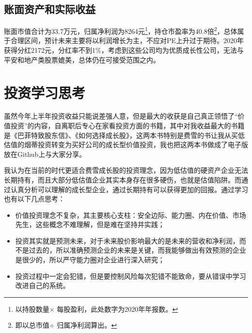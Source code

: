 \documentclass[UTF8,a4paper,12pt,lang=cn,fontset = windows]{elegantpaper} %
\begin{document}
\subsection{账面资产和实际收益}

账面市值合计为33.7万元，归属净利润为8264元\footnote{以持股数量$\times$ 每股盈利，此处数字为2020年年报数。}，持仓市盈率为40.8倍\footnote{即以总市值$\div$ 归属净利润算出。}，总体属于合理区间，预计未来主要将以利润增长为主，不应对PE上升过于期待。2020年获得分红2172元，分红率不到1\%，考虑到这些公司均为优质成长性公司，无法与平安和地产类股票媲美，总体仍在可接受范围之内。

\section{投资学习思考}

虽然今年上半年投资收益只能说差强人意，但是最大的收获是自己真正领悟了“价值投资”的内容，自离职后专心在家看投资方面的书籍，其中对我收益最大的书籍是《巴菲特致股东信》、《如何选择成长股》，这两本书特别是费雪的书让我从买低估值的烟蒂投资转变为买好公司的成长型价值投资，我也把这两本书做成了电子版放在Github上与大家分享。

我认为在当前的时代更适合费雪成长股的投资理念，因为低估值的硬资产企业无法长期持有，而且大部分低估值企业其实本身存在很多硬伤，也就是估值陷阱。而通过认真分析可以理解的成长型企业，通过长期持有可以获得更加的回报。通过学习也有以下几点思考：
\begin{itemize}
    \item \noindent 价值投资理念不复杂，其主要核心支柱：安全边际、能力圈、内在价值、市场先生，这些概念不难理解，但是难在坚持并实践；
    
    \item \noindent 投资其实就是预测未来，对于未来股价影响最大的是未来的营收和净利润，而不是过去的，所以准确预测企业的未来是关键，而我能够做出有效预测的企业是很少的，所以严守能力圈对企业进行深入研究；
    
    \item \noindent 投资过程中一定会犯错，但是要控制风险每次犯错不能致命，要从错误中学习改进自己的系统。
    \end{itemize}
\end{document}
